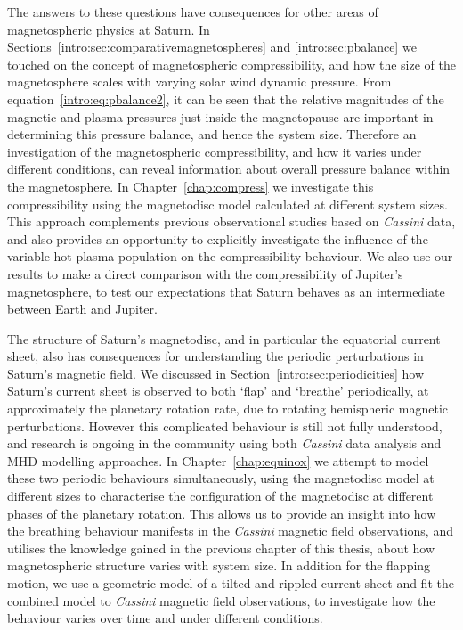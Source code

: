 The answers to these questions have consequences for other areas of magnetospheric physics at Saturn. In Sections~\ref{intro:sec:comparativemagnetospheres} and \ref{intro:sec:pbalance} we touched on the concept of magnetospheric compressibility, and how the size of the magnetosphere scales with varying solar wind dynamic pressure. From equation~\ref{intro:eq:pbalance2}, it can be seen that the relative magnitudes of the magnetic and plasma pressures just inside the magnetopause are important in determining this pressure balance, and hence the system size. Therefore an investigation of the magnetospheric compressibility, and how it varies under different conditions, can reveal information about overall pressure balance within the magnetosphere. In Chapter~\ref{chap:compress} we investigate this compressibility using the \citet{achilleos2010a} magnetodisc model calculated at different system sizes. This approach complements previous observational studies based on \textit{Cassini} data, and also provides an opportunity to explicitly investigate the influence of the variable hot plasma population on the compressibility behaviour. We also use our results to make a direct comparison with the compressibility of Jupiter's magnetosphere, to test our expectations that Saturn behaves as an intermediate between Earth and Jupiter.

The structure of Saturn's magnetodisc, and in particular the equatorial current sheet, also has consequences for understanding the periodic perturbations in Saturn's magnetic field. We discussed in Section~\ref{intro:sec:periodicities} how Saturn's current sheet is observed to both `flap' and `breathe' periodically, at approximately the planetary rotation rate, due to rotating hemispheric magnetic perturbations. However this complicated behaviour is still not fully understood, and research is ongoing in the community using both \textit{Cassini} data analysis and MHD modelling approaches. In Chapter~\ref{chap:equinox} we attempt to model these two periodic behaviours simultaneously, using the \citet{achilleos2010a} magnetodisc model at different sizes to characterise the configuration of the magnetodisc at different phases of the planetary rotation. This allows us to provide an insight into how the breathing behaviour manifests in the \textit{Cassini} magnetic field observations, and utilises the knowledge gained in the previous chapter of this thesis, about how magnetospheric structure varies with system size. In addition for the flapping motion, we use a geometric model of a tilted and rippled current sheet and fit the combined model to \textit{Cassini} magnetic field observations, to investigate how the behaviour varies over time and under different conditions.

